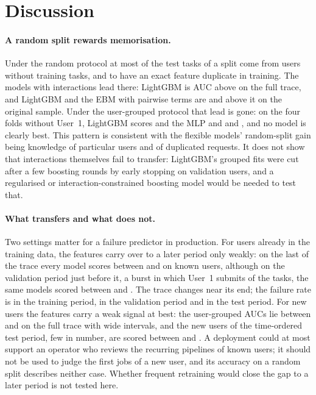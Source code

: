 \section{Discussion}
\label{sec:discussion}

\paragraph{A random split rewards memorisation.} Under the random protocol at most  of the  test tasks of a split come from users without training tasks, and  to  have an exact feature duplicate in training. The models with interactions lead there: LightGBM is  AUC above \kaam{} on the full trace, and LightGBM and the EBM with pairwise terms are  and  above it on the original sample. Under the user-grouped protocol that lead is gone: on the four folds without User~1, LightGBM scores  and the MLP and \kaam{}  and , and no model is clearly best. This pattern is consistent with the flexible models' random-split gain being knowledge of particular users and of duplicated requests. It does not show that interactions themselves fail to transfer: LightGBM's grouped fits were cut after a few boosting rounds by early stopping on validation users, and a regularised or interaction-constrained boosting model would be needed to test that.

\paragraph{What transfers and what does not.} Two settings matter for a failure predictor in production. For users already in the training data, the features carry over to a later period only weakly: on the last  of the trace every model scores between  and  on known users, although on the validation period just before it, a burst in which User~1 submits  of the tasks, the same models scored between  and . The trace changes near its end; the failure rate is  in the training period,  in the validation period and  in the test period. For new users the features carry a weak signal at best: the user-grouped AUCs lie between  and  on the full trace with wide intervals, and the new users of the time-ordered test period, few in number, are scored between  and . A deployment could at most support an operator who reviews the recurring pipelines of known users; it should not be used to judge the first jobs of a new user, and its accuracy on a random split describes neither case. Whether frequent retraining would close the gap to a later period is not tested here.


